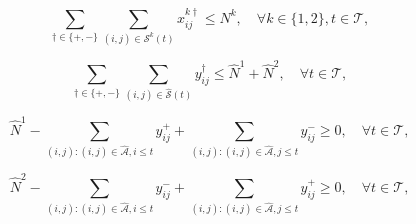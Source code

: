 \documentclass[10pt, reqno]{amsart}
\begin{document}
\noindent {}
\begin{equation}
\sum_{\dagger \in \{+,-\}} \sum_{(i,j) \in \mathcal{S}^k(t)} x_{ij}^{k\dagger} \le N^k, \quad \forall k \in \{1,2\}, t \in \mathcal{T},\label{eq:num man veh}
\end{equation}

\begin{equation}
\sum_{\dagger \in \{+,-\}} \sum_{(i,j) \in \hat{\mathcal{S}}(t)} y_{ij}^{\dagger} \le \hat{N}^1 + \hat{N}^2, \quad \forall t \in \mathcal{T},\label{num auto veh}
\end{equation}

\begin{equation}
 \hat{N}^1-\sum_{(i,j) : (i,j) \in \hat{\mathcal{A}}, i \le t} y_{ij}^+ + \sum_{(i,j) : (i,j) \in \hat{\mathcal{A}}, j \le t} y_{ij}^- \ge 0, \quad \forall t \in \mathcal{T},\label{bal auto +}
\end{equation}

\begin{equation}
 \hat{N}^2-\sum_{(i,j) : (i,j) \in \hat{\mathcal{A}}, i \le t} y_{ij}^- + \sum_{(i,j) : (i,j) \in \hat{\mathcal{A}}, j \le t} y_{ij}^+  \ge 0, \quad \forall t \in \mathcal{T},\label{bal auto -}
\end{equation}
\end{document}
